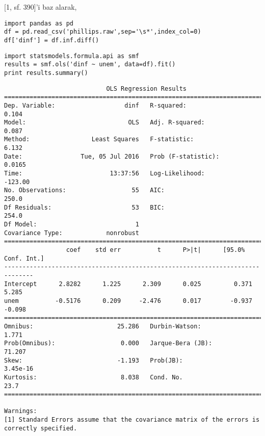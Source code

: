 \documentclass[12pt,fleqn]{article}\usepackage{../../common}
\begin{document}
[1, sf. 390]'i baz alarak,

\begin{verbatim}
import pandas as pd
df = pd.read_csv('phillips.raw',sep='\s*',index_col=0)
df['dinf'] = df.inf.diff()
\end{verbatim}


\begin{verbatim}
import statsmodels.formula.api as smf
results = smf.ols('dinf ~ unem', data=df).fit()
print results.summary()
\end{verbatim}

\begin{verbatim}
                            OLS Regression Results                            
==============================================================================
Dep. Variable:                   dinf   R-squared:                       0.104
Model:                            OLS   Adj. R-squared:                  0.087
Method:                 Least Squares   F-statistic:                     6.132
Date:                Tue, 05 Jul 2016   Prob (F-statistic):             0.0165
Time:                        13:37:56   Log-Likelihood:                -123.00
No. Observations:                  55   AIC:                             250.0
Df Residuals:                      53   BIC:                             254.0
Df Model:                           1                                         
Covariance Type:            nonrobust                                         
==============================================================================
                 coef    std err          t      P>|t|      [95.0% Conf. Int.]
------------------------------------------------------------------------------
Intercept      2.8282      1.225      2.309      0.025         0.371     5.285
unem          -0.5176      0.209     -2.476      0.017        -0.937    -0.098
==============================================================================
Omnibus:                       25.286   Durbin-Watson:                   1.771
Prob(Omnibus):                  0.000   Jarque-Bera (JB):               71.207
Skew:                          -1.193   Prob(JB):                     3.45e-16
Kurtosis:                       8.038   Cond. No.                         23.7
==============================================================================

Warnings:
[1] Standard Errors assume that the covariance matrix of the errors is correctly specified.
\end{verbatim}
\end{document}
